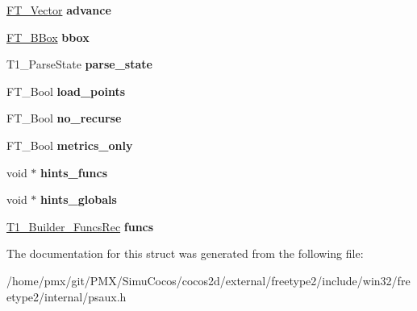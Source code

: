 \begin{DoxyCompactItemize}
\hyperlink{structFT__Vector__}{F\+T\+\_\+\+Vector} {\bfseries advance}
\item 
\mbox{\label{structT1__BuilderRec___a534c6d954f8cf791a94489350314a8f7}} 
\hyperlink{structFT__BBox__}{F\+T\+\_\+\+B\+Box} {\bfseries bbox}
\item 
\mbox{\label{structT1__BuilderRec___afaa675cc3601ed05ed86bc474153094b}} 
T1\+\_\+\+Parse\+State {\bfseries parse\+\_\+state}
\item 
\mbox{\label{structT1__BuilderRec___acaf59a770471bf90b5b7d9f72e97e64e}} 
F\+T\+\_\+\+Bool {\bfseries load\+\_\+points}
\item 
\mbox{\label{structT1__BuilderRec___a0369f22bec404666e1c7dc6bb648ac28}} 
F\+T\+\_\+\+Bool {\bfseries no\+\_\+recurse}
\item 
\mbox{\label{structT1__BuilderRec___ab4c509b363e5a5f4da25460413e9364f}} 
F\+T\+\_\+\+Bool {\bfseries metrics\+\_\+only}
\item 
\mbox{\label{structT1__BuilderRec___a82cdc6a08b73e8ff6e78e9347cb42d18}} 
void $\ast$ {\bfseries hints\+\_\+funcs}
\item 
\mbox{\label{structT1__BuilderRec___a3edb26f244e956e195a0c8c2e0c9f3d4}} 
void $\ast$ {\bfseries hints\+\_\+globals}
\item 
\mbox{\label{structT1__BuilderRec___acecf3c6c134bccd36a1d30e10147ca54}} 
\hyperlink{structT1__Builder__FuncsRec__}{T1\+\_\+\+Builder\+\_\+\+Funcs\+Rec} {\bfseries funcs}
\end{DoxyCompactItemize}


The documentation for this struct was generated from the following file\+:\begin{DoxyCompactItemize}
\item 
/home/pmx/git/\+P\+M\+X/\+Simu\+Cocos/cocos2d/external/freetype2/include/win32/freetype2/internal/psaux.\+h\end{DoxyCompactItemize}
